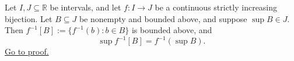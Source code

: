 \begin{theorem}
\label{thm:increasing-inverse-preserves-suprema}
Let $I,J\subseteq\mathbb{R}$ be intervals, and let $f\colon I\to J$ be a continuous
strictly increasing bijection.  Let $B\subseteq J$ be nonempty and bounded
above, and suppose $\sup B\in J$.  Then
$f^{-1}[B]:=\{f^{-1}(b):b\in B\}$ is bounded above, and
\[
  \sup f^{-1}[B]=f^{-1}(\sup B).
\]
\hyperref[prf:increasing-inverse-preserves-suprema]{Go to proof.}
\end{theorem}